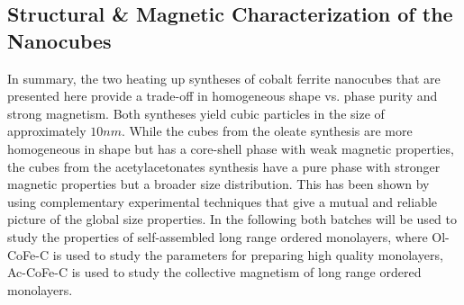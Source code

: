 \documentclass[\main/dresen_thesis.tex]{subfiles}
\renewcommand{\thisPath}{\main/chapters/monolayers/nanoparticles/}
\begin{document}
  

  \subsection{Structural \& Magnetic Characterization of the Nanocubes}
    
      \FloatBarrier

  In summary, the two heating up syntheses of cobalt ferrite nanocubes that are presented here provide a trade-off in homogeneous shape vs. phase purity and strong magnetism.
  Both syntheses yield cubic particles in the size of approximately $10 \unit{nm}$.
  While the cubes from the oleate synthesis are more homogeneous in shape but has a core-shell phase with weak magnetic properties, the cubes from the acetylacetonates synthesis have a pure phase with stronger magnetic properties but a broader size distribution.
  This has been shown by using complementary experimental techniques that give a mutual and reliable picture of the global size properties.
  In the following both batches will be used to study the properties of self-assembled long range ordered monolayers, where Ol-CoFe-C is used to study the parameters for preparing high quality monolayers, Ac-CoFe-C is used to study the collective magnetism of long range ordered monolayers.
\end{document}
